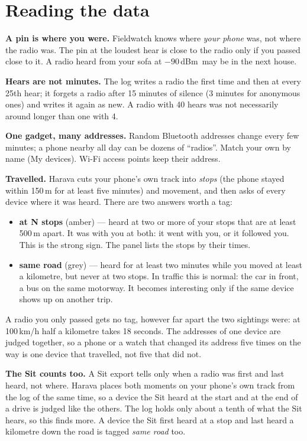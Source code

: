 \documentclass[10pt,a4paper]{article}
\newcommand{\dBm}{\,dBm}
\newcommand{\lead}[1]{\textbf{#1}\enspace}           %
\begin{document}
\section{Reading the data}\label{sec:reading}

\lead{A pin is where you were.} Fieldwatch knows where \emph{your phone} was, not where the radio was. The pin at the loudest hear is close to the radio only if you passed close to it. A radio heard from your sofa at $-90$\dBm\ may be in the next house.

\lead{Hears are not minutes.} The log writes a radio the first time and then at every 25th hear; it forgets a radio after 15 minutes of silence (3 minutes for anonymous ones) and writes it again as new. A radio with 40 hears was not necessarily around longer than one with 4.

\lead{One gadget, many addresses.} Random Bluetooth addresses change every few minutes; a phone nearby all day can be dozens of ``radios''. Match your own by name (My devices). Wi-Fi access points keep their address.

\lead{Travelled.} Harava cuts your phone's own track into \emph{stops} (the phone stayed within 150\,m for at least five minutes) and movement, and then asks of every device where it was heard. There are two answers worth a tag:
\begin{itemize}
\item \textbf{at N stops} (amber) --- heard at two or more of your stops that are at least 500\,m apart. It was with you at both: it went with you, or it followed you. This is the strong sign. The panel lists the stops by their times.
\item \textbf{same road} (grey) --- heard for at least two minutes while you moved at least a kilometre, but never at two stops. In traffic this is normal: the car in front, a bus on the same motorway. It becomes interesting only if the same device shows up on another trip.
\end{itemize}
A radio you only passed gets no tag, however far apart the two sightings were: at 100\,km/h half a kilometre takes 18 seconds. The addresses of one device are judged together, so a phone or a watch that changed its address five times on the way is one device that travelled, not five that did not.

\lead{The Sit counts too.} A Sit export tells only when a radio was first and last heard, not where. Harava places both moments on your phone's own track from the log of the same time, so a device the Sit heard at the start and at the end of a drive is judged like the others. The log holds only about a tenth of what the Sit hears, so this finds more. A device the Sit first heard at a stop and last heard a kilometre down the road is tagged \emph{same road} too.
\end{document}
